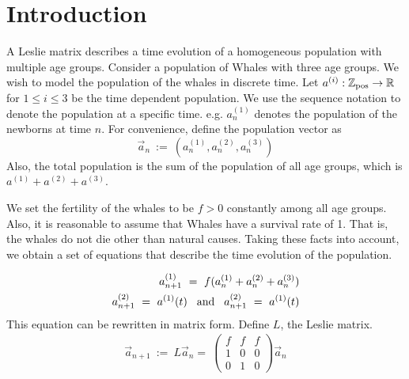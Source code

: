\documentclass[11pt,reqno]{amsart}
\numberwithin{equation}{section}
\theoremstyle{plain}
\newcommand{\textAnd}{\hspace{3mm}\textnormal{and}\hspace{3mm}}
\begin{document}
\section{Introduction}

A Leslie matrix describes a time evolution of a homogeneous population with multiple age groups. Consider a population of Whales with three age groups. We wish to model the population of the whales in discrete time. Let $a^{(i)}:\mathbb Z_{\rm pos} \rightarrow \mathbb R$ for $1 \leq i \leq 3$ be the time dependent 
population. We use the sequence notation to denote the population at a specific time. e.g. $a_n^{(1)}$ denotes the population of the newborns at time $n$. For convenience, define the population vector as 
\begin{equation}
    \vec a_n \ := \ (a^{(1)}_n, a^{(2)}_n, a^{(3)}_n)
\end{equation}
Also, the total population is the sum of the population of 
all age groups, which is $a^{(1)} + a^{(2)} + a^{(3)}$. 

We set the fertility of the whales to be $f > 0$ constantly among all age groups. Also, it is reasonable to assume that Whales have a survival rate of 1. That is, the whales do not die other than natural causes. Taking these facts into account, we obtain a set of equations that describe the time evolution of the population. 

\begin{eqnarray}
    a^{(1)}_{n + 1} \ = \ f(a^{(1)}_n + a^{(2)}_n + a^{(3)}_n) 
    \nonumber \\ 
    a^{(2)}_{n + 1} \ = \ a^{(1)}(t) \textAnd a^{(2)}_{n + 1} \ = \ a^{(1)}(t)  
\end{eqnarray}
This equation can be rewritten in matrix form. Define $L$, the Leslie matrix. 
\begin{eqnarray}
    \vec a_{n + 1} \ :=\ L\vec a_n = \ 
    \begin{pmatrix}
        f & f & f \\ 
        1 & 0 & 0 \\
        0 & 1 & 0
    \end{pmatrix}\vec a_n
\end{eqnarray}
\end{document}
